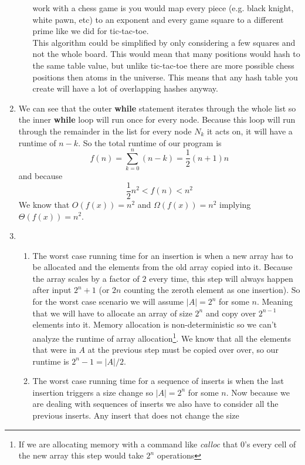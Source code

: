 \documentclass[11pt]{article}
\begin{document}
\begin{enumerate}
\begin{enumerate}
			work with a chess game is you would map every piece (e.g. black
			knight, white pawn, etc)
	to an exponent 
			and every game square to a different prime like we did
			for tic-tac-toe. \\
			This algorithm could be simplified by only considering
			a few squares and not the whole board. This would mean that many positions
			would hash to the same table value, but unlike tic-tac-toe 
			there are more possible chess positions then atoms in
			the universe. This means that any hash table you create
			will have a lot of overlapping hashes anyway.\\
	\end{enumerate}
\item We can see that the outer \textbf{while} statement iterates through the
	whole list so the inner \textbf{while} loop will run once for every
	node. Because this loop will run through the remainder in the list for
	every node $N_k$ it acts on, it will have a runtime of $n-k$. So the
	total runtime of our program is
	$$f(n) = \sum^{n}_{k=0}(n-k) = \frac{1}{2}(n+1)n$$
	and because $$ \frac{1}{2}n^2  < f(n) < n^2 $$
	We know that $O(f(x)) = n^2$ and $\Omega(f(x)) = n^2$ implying $\Theta(f(x))
	= n^2$.
\item 
\begin{enumerate}
	\item The worst case running time for an insertion is when a new array
		has to be allocated and the elements from the old array copied
		into it. Because the array scales by a factor of $2$ every time, 
		this step will always happen after input $2^n
		+1$ (or $2n$ counting the zeroth element as one insertion). So
		for the worst case scenario we will assume $|A| = 2^n$ for some
		$n$. Meaning that we will have to allocate an array of size
		$2^{n}$ and copy over $2^{n-1}$ elements into it. Memory
		allocation is non-deterministic so we can't analyze the runtime
		of array allocation\footnote{If we are allocating memory with a
		command like \textit{calloc} that $0$'s every cell of the new
		array this step would take $2^{n}$ operations}. We know
		that all the elements that were in $A$ at the previous step
		must be copied over over, so our runtime
		is  $2^n-1 = |A|/2$.
	\item The worst case running time for a sequence of inserts is when the
		last insertion triggers a size change so $|A| = 2^n$ for some
		$n$. Now because we are
		dealing with sequences of inserts we also have to consider all
		the previous inserts. Any insert that does not change the size

\end{enumerate}
\end{enumerate}
\end{document}

